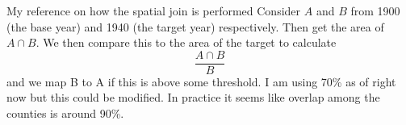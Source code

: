 \documentclass[notes,11pt, aspectratio=169]{beamer}
\begin{document}
\begin{frame}{My reference on how the spatial join is performed}
  Consider $A$ and $B$ from 1900 (the base year) and 1940 (the target year) respectively. Then get the area of $A\cap B$. We then compare this to the area of the target to calculate 
  \begin{equation}
  \frac{A\cap B}{B}  
  \end{equation}
  and we map B to A if this is above some threshold. I am using 70\% as of right now but this could be modified. In practice it seems like overlap among the counties is around 90\%.
\end{frame}
\end{document}
